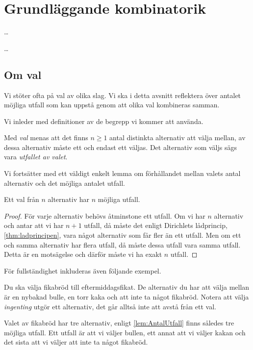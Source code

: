 \chapter{Grundläggande kombinatorik}
\label{ch:Kombinatorik}

\begin{theorem}\label{thm:ladprincipen}
  \dots
\end{theorem}

\begin{theorem}[Additionsprincipen]
  \dots
\end{theorem}

\section{Om val}
Vi stöter ofta på val av olika slag.
Vi ska i detta avsnitt reflektera över antalet möjliga utfall som kan uppstå
genom att olika val kombineras samman.

Vi inleder med definitioner av de begrepp vi kommer att använda.

\begin{definition}\label{def:Val}
  Med \emph{val} menas att det finns \(n \geq 1\) antal distinkta alternativ
  att välja mellan, av dessa alternativ måste ett och endast ett väljas.
  Det alternativ som väljs sägs vara \emph{utfallet av valet}.
\end{definition}

Vi fortsätter med ett väldigt enkelt lemma om förhållandet mellan valets
antal alternativ och det möjliga antalet utfall.

\begin{lemma}\label{lem:AntalUtfall}
  Ett val från \(n\) alternativ har \(n\) möjliga utfall.
\end{lemma}
\begin{proof}
  För varje alternativ behövs åtminstone ett utfall.
  Om vi har \(n\) alternativ och antar att vi har \(n+1\) utfall,
  då måste det enligt Dirichlets lådprincip, \cref{thm:ladprincipen}, vara 
  något alternativ som får fler än ett utfall.
  Men om ett och samma alternativ har flera utfall, då måste dessa utfall
  vara samma utfall.
  Detta är en motsägelse och därför måste vi ha exakt \(n\) utfall.
\end{proof}

För fullständighet inkluderas även följande exempel.
\begin{example}\label{ex:Fikabrod}
  Du ska välja fikabröd till eftermiddagsfikat.
  De alternativ du har att välja mellan är en nybakad bulle, en torr kaka och
  att inte ta något fikabröd.
  Notera att välja \emph{ingenting} utgör ett alternativ, det går alltså inte
  att avstå från ett val.

  Valet av fikabröd har tre alternativ, enligt \cref{lem:AntalUtfall}
  finns således tre möjliga utfall.
  Ett utfall är att vi väljer bullen, ett annat att vi väljer kakan och det
  sista att vi väljer att inte ta något fikabröd.
\end{example}

